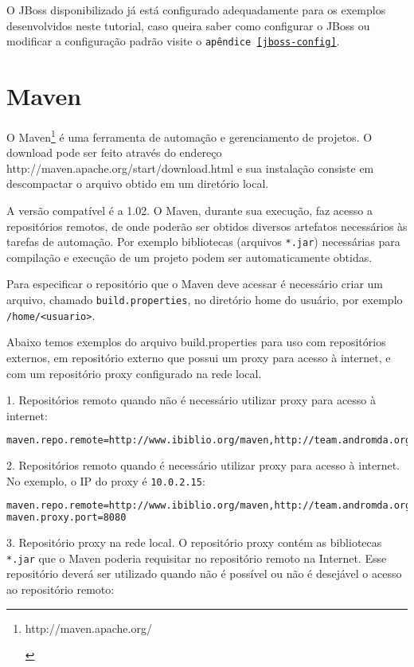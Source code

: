 O JBoss disponibilizado já está configurado adequadamente para os exemplos
desenvolvidos neste tutorial, caso queira saber como configurar o JBoss ou
modificar a configuração padrão visite o \texttt{apêndice \ref{jboss-config}}.

\section{Maven}
O Maven\footnote{\hypertarget{http://maven.apache.org/}{http://maven.apache.org/}} é uma ferramenta de automação e gerenciamento de projetos. O download pode ser feito através do endereço \hypertarget{http://maven.apache.org/start/download.html}{http://maven.apache.org/start/download.html} e sua instalação consiste em descompactar o arquivo obtido em um diretório local. 

A versão compatível é a 1.02. O Maven, durante sua execução, faz acesso a repositórios remotos, de onde poderão ser obtidos diversos artefatos necessários às tarefas de automação. Por exemplo bibliotecas (arquivos \texttt{*.jar}) necessárias para compilação e execução de um projeto podem ser automaticamente obtidas. 

Para especificar o repositório que o Maven deve acessar é necessário criar um arquivo, chamado \texttt{build.properties}, no diretório home do usuário, por exemplo \texttt{/home/<usuario>}. 

Abaixo temos exemplos do arquivo build.properties para uso com repositórios externos, em repositório externo que possui um proxy para acesso à internet, e com um repositório proxy configurado na rede local. 

1. Repositórios remoto quando não é necessário utilizar proxy para acesso à internet: 

\begin{lstlisting}[language=bash]
maven.repo.remote=http://www.ibiblio.org/maven,http://team.andromda.org/maven 
\end{lstlisting}

2. Repositórios remoto quando é necessário utilizar proxy para acesso à internet. No exemplo, o IP do proxy é \texttt{10.0.2.15}: 

\begin{lstlisting}[language=bash]
maven.repo.remote=http://www.ibiblio.org/maven,http://team.andromda.org/maven maven.proxy.host=10.0.2.15 
maven.proxy.port=8080 
\end{lstlisting}

3. Repositório proxy na rede local. O repositório proxy contém as bibliotecas \texttt{*.jar} que o Maven poderia requisitar no repositório remoto na Internet. Esse repositório deverá ser utilizado quando não é possível ou não é desejável o acesso ao repositório remoto:

